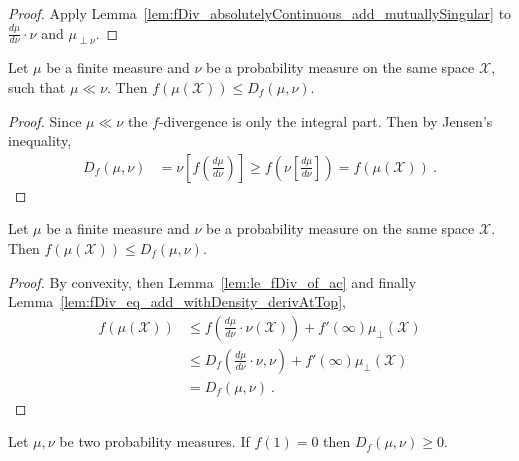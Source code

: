 \begin{proof}\leanok
{}
Apply Lemma~\ref{lem:fDiv_absolutelyContinuous_add_mutuallySingular} to $\frac{d\mu}{d\nu}\cdot \nu$ and $\mu_{\perp \nu}$.
\end{proof}

\begin{lemma}
  \label{lem:le_fDiv_of_ac}
  \leanok
  Let $\mu$ be a finite measure and $\nu$ be a probability measure on the same space $\mathcal X$, such that $\mu \ll \nu$. Then $f(\mu(\mathcal X)) \le D_f(\mu, \nu)$.
\end{lemma}

\begin{proof}\leanok
Since $\mu \ll \nu$ the $f$-divergence is only the integral part. Then by Jensen's inequality,
\begin{align*}
D_f(\mu, \nu)
&= \nu\left[ f\left( \frac{d\mu}{d\nu} \right) \right]
\ge f\left( \nu\left[\frac{d\mu}{d\nu} \right] \right)
= f(\mu(\mathcal X))
\: .
\end{align*}

\end{proof}

\begin{lemma}
  \label{lem:le_fDiv}
  \leanok
  Let $\mu$ be a finite measure and $\nu$ be a probability measure on the same space $\mathcal X$. Then $f(\mu(\mathcal X)) \le D_f(\mu, \nu)$.
\end{lemma}

\begin{proof}\leanok
{}
By convexity, then Lemma~\ref{lem:le_fDiv_of_ac} and finally Lemma~\ref{lem:fDiv_eq_add_withDensity_derivAtTop},
\begin{align*}
f(\mu(\mathcal X))
&\le f(\frac{d\mu}{d\nu}\cdot \nu (\mathcal X)) + f'(\infty)\mu_{\perp}(\mathcal X)
\\
&\le D_f(\frac{d\mu}{d\nu}\cdot \nu , \nu) + f'(\infty)\mu_{\perp}(\mathcal X)
\\
&= D_f(\mu, \nu)
\: .
\end{align*}
\end{proof}

\begin{lemma}
  \label{lem:fDiv_nonneg}
  \leanok
  Let $\mu, \nu$ be two probability measures. If $f(1) = 0$ then $D_f(\mu, \nu) \ge 0$.
\end{lemma}


